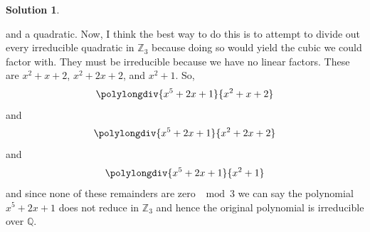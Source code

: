 \documentclass[10pt]{article}
\theoremstyle{definition}
\newtheorem{soln}{Solution}
\begin{document}
\begin{soln}
\begin{enumerate}[label=(\alph*)]
\begin{enumerate}[label=(\roman*)]
                  and a quadratic. Now, I think the best way to do this is to attempt to divide out every irreducible quadratic in $\mathbb{Z}_3$
                  because doing so would yield the cubic we could factor with. They must be irreducible because we have no linear factors.
                  These are $x^2+x+2$, $x^2+2x+2$, and $x^2+1$. So,
                  \begin{equation}
                    \polylongdiv{x^5+2x+1}{x^2+x+2}
                  \end{equation}
                  and
                  \begin{equation}
                    \polylongdiv{x^5+2x+1}{x^2+2x+2}
                  \end{equation}
                  and
                  \begin{equation}
                    \polylongdiv{x^5+2x+1}{x^2+1}
                  \end{equation}
                  and since none of these remainders are zero $\mod 3$ we can say the polynomial $x^5+2x+1$ does not reduce in $\mathbb{Z}_3$ and hence the original polynomial is irreducible over $\mathbb{Q}$.
          \end{enumerate}
  \end{enumerate}
\end{soln}
\end{document}
